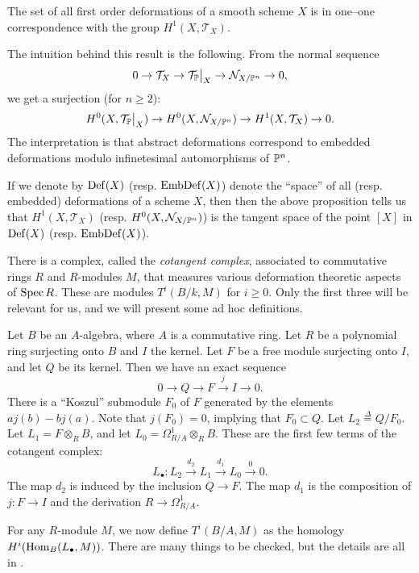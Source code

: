 \begin{proposition}
The set of all first order deformations of a smooth scheme $X$ is in one--one correspondence with the group $H^1(X,\mathcal T_X)$.
\end{proposition}

\begin{remark}
The intuition behind this result is the following. From the normal sequence
\[
0 \to \mathcal T_X \to \restr{\mathcal T_\P}{X} \to \mathcal N_{X/\P^n} \to 0,
\]
we get a surjection (for $n \geq 2$):
\[
H^0(X, \restr{\mathcal T_\P}{X}) \to H^0(X,\mathcal N_{X/\P^n}) \to H^1(X,\mathcal T_X) \to 0.
\]
The interpretation is that abstract deformations correspond to embedded deformations modulo infinetesimal automorphisms of $\P^n$.
\end{remark}

If we denote by $\Def(X)$  (resp. $\EmbDef(X)$) denote the ``space'' of all (resp. embedded) deformations of a scheme $X$, then then the above proposition tells us that $H^1(X,\mathcal T_X)$ (resp. $H^0(X,\mathcal N_{X/\P^n})$) is the tangent space of the point $[X]$ in $\Def(X)$ (resp. $\EmbDef(X)$).

There is a complex, called the \emph{cotangent complex}, associated to commutative rings $R$ and $R$-modules $M$, that measures various deformation theoretic aspects of $\Spec R$. These are modules $T^i(B/k,M)$ for $i \geq 0$. Only the first three will be relevant for us, and we will present some ad hoc definitions.

Let $B$ be an $A$-algebra, where $A$ is a commutative ring. Let $R$ be a polynomial ring surjecting onto $B$ and $I$ the kernel. Let $F$ be a free module surjecting onto $I$, and let $Q$ be its kernel. Then we have an exact sequence
\[
0 \to Q \to F \xrightarrow{j} I \to 0.
\]
There is a ``Koszul'' submodule $F_0$ of $F$ generated by the elements $aj(b)-bj(a)$. Note that $j(F_0)=0$, implying that $F_0 \subset Q$. Let $L_2 \stackrel \Delta = Q/F_0$. Let $L_1 = F \otimes_R B$, and let $L_0 = \Omega_{R/A}^1 \otimes_R B$. These are the first few terms of the cotangent complex:
\[
L_\bullet: L_2 \xrightarrow{d_2} L_1 \xrightarrow{d_1}  L_0 \xrightarrow{0} 0.
\]
The map $d_2$ is induced by the inclusion $Q \to F$. The map $d_1$ is the composition of $j:F \to I$ and the derivation $R \to \Omega^1_{R/A}$.

For any $R$-module $M$, we now define $T^i(B/A,M)$ as the homology $H^i(\Hom_B(L_\bullet,M))$. There are many things to be checked, but the details are all in \cite{hartshorne_deformations}.

